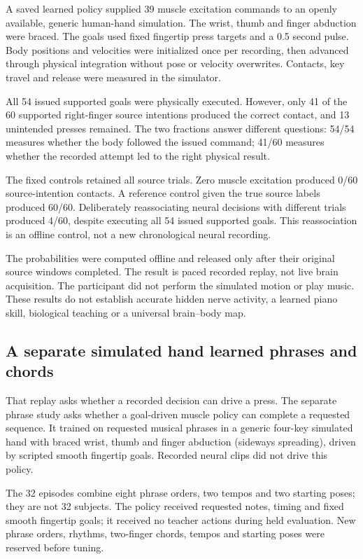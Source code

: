 A saved learned policy supplied 39 muscle excitation commands to an openly
available, generic human-hand simulation. The wrist, thumb and finger abduction
were braced. The goals used fixed fingertip press targets and a 0.5 second pulse.
Body positions and velocities were initialized once per recording, then advanced
through physical integration without pose or velocity overwrites. Contacts, key
travel and release were measured in the simulator.

All 54 issued supported goals were physically executed. However, only 41 of the
60 supported right-finger source intentions produced the correct contact, and
13 unintended presses remained. The two fractions answer different questions:
54/54 measures whether the body followed the issued command; 41/60 measures
whether the recorded attempt led to the right physical result.

The fixed controls retained all source trials. Zero muscle excitation produced
0/60 source-intention contacts. A reference control given the true source labels
produced 60/60. Deliberately reassociating neural decisions with different trials
produced 4/60, despite executing all 54 issued supported goals. This reassociation
is an offline control, not a new chronological neural recording.

The probabilities were computed offline and released only after their original
source windows completed. The result is paced recorded replay, not live brain
acquisition. The participant did not perform the simulated motion or play music.
These results do not establish accurate hidden nerve activity, a learned piano
skill, biological teaching or a universal brain--body map.

\subsection{A separate simulated hand learned phrases and chords}

That replay asks whether a recorded decision can drive a press. The separate phrase study asks whether a goal-driven muscle policy can complete a requested sequence. It trained on requested musical phrases in a generic four-key simulated hand with braced wrist, thumb and finger abduction (sideways spreading), driven by scripted smooth fingertip goals. Recorded neural clips did not drive this policy.

The 32 episodes combine eight phrase orders, two tempos and two starting poses; they are not 32 subjects. The policy received requested notes, timing and fixed smooth fingertip goals; it received no teacher actions during held evaluation. New phrase orders, rhythms, two-finger chords, tempos and starting poses were reserved before tuning.

